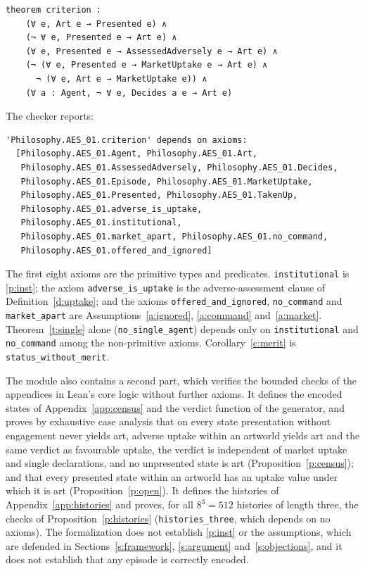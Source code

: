 \documentclass{situationist-preprint}
\begin{document}
\begin{lstlisting}
theorem criterion :
    (∀ e, Art e → Presented e) ∧
    (¬ ∀ e, Presented e → Art e) ∧
    (∀ e, Presented e → AssessedAdversely e → Art e) ∧
    (¬ (∀ e, Presented e → MarketUptake e → Art e) ∧
      ¬ (∀ e, Art e → MarketUptake e)) ∧
    (∀ a : Agent, ¬ ∀ e, Decides a e → Art e)
\end{lstlisting}

The checker reports:

\begin{lstlisting}
'Philosophy.AES_01.criterion' depends on axioms:
  [Philosophy.AES_01.Agent, Philosophy.AES_01.Art,
   Philosophy.AES_01.AssessedAdversely, Philosophy.AES_01.Decides,
   Philosophy.AES_01.Episode, Philosophy.AES_01.MarketUptake,
   Philosophy.AES_01.Presented, Philosophy.AES_01.TakenUp,
   Philosophy.AES_01.adverse_is_uptake,
   Philosophy.AES_01.institutional,
   Philosophy.AES_01.market_apart, Philosophy.AES_01.no_command,
   Philosophy.AES_01.offered_and_ignored]
\end{lstlisting}

The first eight axioms are the primitive types and predicates. \texttt{institutional} is \ref{p:inst}; the axiom \texttt{adverse\_is\_uptake} is the adverse-assessment clause of Definition~\ref{d:uptake}; and the axioms \texttt{offered\_and\_ignored}, \texttt{no\_command} and \texttt{market\_apart} are Assumptions~\ref{a:ignored}, \ref{a:command} and~\ref{a:market}. Theorem~\ref{t:single} alone (\texttt{no\_single\_agent}) depends only on \texttt{institutional} and \texttt{no\_command} among the non-primitive axioms. Corollary~\ref{c:merit} is \texttt{status\_without\_merit}.

The module also contains a second part, which verifies the bounded checks of the appendices in Lean's core logic without further axioms. It defines the encoded states of Appendix~\ref{app:census} and the verdict function of the generator, and proves by exhaustive case analysis that on every state presentation without engagement never yields art, adverse uptake within an artworld yields art and the same verdict as favourable uptake, the verdict is independent of market uptake and single declarations, and no unpresented state is art (Proposition~\ref{p:census}); and that every presented state within an artworld has an uptake value under which it is art (Proposition~\ref{p:open}). It defines the histories of Appendix~\ref{app:histories} and proves, for all $8^3 = 512$ histories of length three, the checks of Proposition~\ref{p:histories} (\texttt{histories\_three}, which depends on no axioms). The formalization does not establish \ref{p:inst} or the assumptions, which are defended in Sections~\ref{s:framework}, \ref{s:argument} and~\ref{s:objections}, and it does not establish that any episode is correctly encoded.
\end{document}
